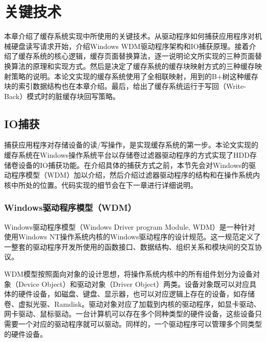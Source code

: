 
\chapter{关键技术}
\label{cha:key_tech}

本章介绍了缓存系统实现中所使用的关键技术。从驱动程序如何捕获应用程序对机械硬盘读写请求开始，介绍Windows WDM驱动程序架构和IO捕获原理。接着介绍了缓存系统的核心逻辑，缓存页面替换算法，逐一说明论文所实现的三种页面替换算法的原理和实现方式。然后是决定了缓存系统的缓存块映射方式的三种缓存映射策略的说明。本论文实现的缓存系统使用了全相联映射，用到的B+树这种缓存块的索引数据结构也在本章介绍。最后，给出了缓存系统运行于写回（Write-Back）模式时的脏缓存块回写策略。

\section{IO捕获}
\label{sec:capture_io}

捕获应用程序对存储设备的读/写操作，是实现缓存系统的第一步。本论文实现的缓存系统在Windows操作系统平台以存储卷过滤器驱动程序的方式实现了HDD存储卷设备的IO捕获功能。在介绍具体的捕获方式之前，本节先会对Windows的驱动程序模型（WDM）加以介绍，然后介绍过滤器驱动程序的结构和在操作系统内核中所处的位置。代码实现的细节会在下一章进行详细说明。

\subsection{Windows驱动程序模型（WDM）}
Windows驱动程序模型（Windows Driver program Module, WDM）是一种针对使用Windows NT操作系统内核的Windows驱动程序的设计规范\cite{wdm2001}。这一规范定义了一整套的驱动程序开发所使用的函数接口、数据结构、组织关系和模块间的交互协议。

WDM模型按照面向对象的设计思想，将操作系统内核中的所有组件划分为设备对象（Device Object）和驱动对象（Driver Object）两类。设备对象既可以对应具体的硬件设备，如磁盘、键盘、显示器，也可以对应逻辑上存在的设备，如存储卷、虚拟光驱、Ramdisk。驱动对象对应了加载到内核的驱动程序，如显卡驱动、网卡驱动、鼠标驱动。一台计算机可以存在多个同种类型的硬件设备，这些设备只需要一个对应的驱动程序就可以驱动。同样的，一个驱动程序可以管理多个同类型的硬件设备。

